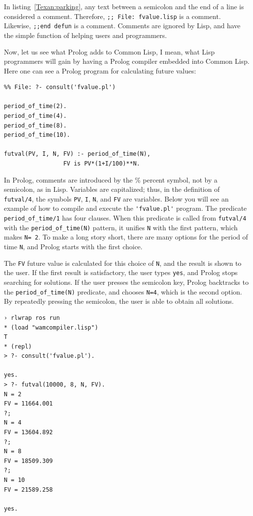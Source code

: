 \documentclass[a4paper,12pt]{book}
\begin{document}
In listing~\ref{Texan:parking}, any text
between a semicolon and the end of
a line is considered a comment.
Therefore, \verb|;; File: fvalue.lisp|
is a comment. Likewise, \verb|;;end defun|
is a comment. Comments are ignored by
Lisp, and have the simple function of
helping users and programmers.

Now, let us see what Prolog adds to Common Lisp,
I mean, what Lisp programmers will gain by
having a Prolog compiler embedded into Common
Lisp. Here one can see a Prolog program for
calculating future values:
\begin{verbatim}
%% File: ?- consult('fvalue.pl')

period_of_time(2).
period_of_time(4).
period_of_time(8).
period_of_time(10).

futval(PV, I, N, FV) :- period_of_time(N),
                 FV is PV*(1+I/100)**N.
\end{verbatim}

In Prolog, comments are introduced by the \%
percent symbol, not by a semicolon, as in Lisp.
Variables are capitalized; thus, in the definition
of \verb|futval/4|, the symbols \verb|PV|, \verb|I|,
\verb|N|, and \verb|FV| are variables. Below you will
see an example of how to compile and execute
the \verb|'fvalue.pl'| program. The predicate
\verb|period_of_time/1| has four clauses. When
this predicate is called from \verb|futval/4| with the 
\verb|period_of_time(N)| pattern, it unifies \verb|N|
with the first pattern, which makes \verb|N= 2|.
To make a long story short, there are many
options for the period of time \verb|N|, and Prolog
starts with the first choice.

The \verb|FV| future value is calculated for this choice
of \verb|N|, and the result is shown to the user. If the
first result is satisfactory, the user types
\verb|yes|, and Prolog stops searching for
solutions. If the user presses the semicolon
key, Prolog backtracks to the \verb|period_of_time(N)|
predicate, and chooses \verb|N=4|, which is
the second option. By repeatedly pressing
the semicolon, the user is able to obtain all solutions.

\begin{verbatim}
› rlwrap ros run
* (load "wamcompiler.lisp")
T
* (repl)
> ?- consult('fvalue.pl').

yes.
> ?- futval(10000, 8, N, FV).
N = 2
FV = 11664.001
?;
N = 4
FV = 13604.892
?;
N = 8
FV = 18509.309
?;
N = 10
FV = 21589.258

yes.
\end{verbatim}
\end{document}
